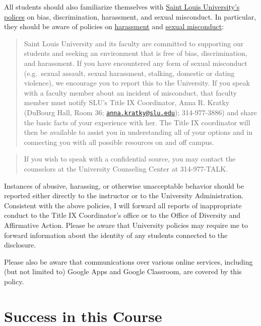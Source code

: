 \documentclass[]{book}
\begin{document}
All students should also familiarize themselves with \href{http://www.slu.edu/general-counsel-home/office-of-institutional-equity-and-diversity}{Saint Louis University's polices} on bias, discrimination, harassment, and sexual misconduct. In particular, they should be aware of policies on \href{https://www.slu.edu/general-counsel/institutional-equity-diversity/pdfs/harassment-policy.pdf}{harassment} and \href{https://www.slu.edu/about/safety/sexual-assault-resources.php}{sexual misconduct}:

\begin{quote}
Saint Louis University and its faculty are committed to supporting our students and seeking an environment that is free of bias, discrimination, and harassment. If you have encountered any form of sexual misconduct (e.g.~sexual assault, sexual harassment, stalking, domestic or dating violence), we encourage you to report this to the University. If you speak with a faculty member about an incident of misconduct, that faculty member must notify SLU's Title IX Coordinator, Anna R. Kratky (DuBourg Hall, Room 36; \href{mailto:anna.kratky@slu.edu}{\nolinkurl{anna.kratky@slu.edu}}); 314-977-3886) and share the basic facts of your experience with her. The Title IX coordinator will then be available to assist you in understanding all of your options and in connecting you with all possible resources on and off campus.
\end{quote}

\begin{quote}
If you wish to speak with a confidential source, you may contact the counselors at the University Counseling Center at 314-977-TALK.
\end{quote}

Instances of abusive, harassing, or otherwise unacceptable behavior should be reported either directly to the instructor or to the University Administration. Consistent with the above policies, I will forward all reports of inappropriate conduct to the Title IX Coordinator's office or to the Office of Diversity and Affirmative Action. Please be aware that University policies may require me to forward information about the identity of any students connected to the disclosure.

Please also be aware that communications over various online services, including (but not limited to) Google Apps and Google Classroom, are covered by this policy.

\hypertarget{success-in-this-course}{%
\chapter{Success in this Course}\label{success-in-this-course}}
\end{document}
